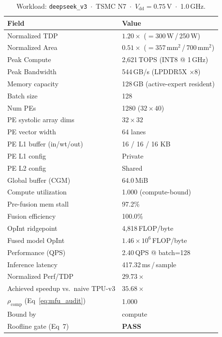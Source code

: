 \begin{table}[h]
\centering
\caption{Workload: \texttt{deepseek\_v3}~$\cdot$~TSMC N7~$\cdot$~$V_\text{dd}=0.75$\,V~$\cdot$~1.0\,GHz.}
\label{tab:cheetah_v1_deepseek_v3}
\small\setlength{\tabcolsep}{6pt}
\begin{tabular}{@{}ll@{}}
\toprule
\textbf{Field} & \textbf{Value} \\
\midrule
Normalized TDP          & $1.20\times$ ($= 300$\,W\,/\,250\,W) \\
Normalized Area         & $0.51\times$ ($= 357$\,mm$^2$\,/\,700\,mm$^2$) \\
Peak Compute            & 2{,}621\,TOPS (INT8 @ 1\,GHz) \\
Peak Bandwidth          & 544\,GB/s (LPDDR5X $\times$8) \\
Memory capacity         & 128\,GB (active-expert resident) \\
Batch size              & 128 \\
Num PEs                 & 1280 ($32 \times 40$) \\
PE systolic array dims  & $32 \times 32$ \\
PE vector width         & 64 lanes \\
PE L1 buffer (in/wt/out) & 16 / 16 / 16 KB \\
PE L1 config            & Private \\
PE L2 config            & Shared \\
Global buffer (CGM)     & 64.0\,MiB \\
\midrule
Compute utilization     & 1.000 (compute-bound) \\
Pre-fusion mem stall    & 97.2\% \\
Fusion efficiency       & 100.0\% \\
OpInt ridgepoint        & 4{,}818\,FLOP/byte \\
Fused model OpInt       & $1.46 \times 10^{6}$\,FLOP/byte \\
Performance (QPS)       & 2.40\,QPS @ batch=128 \\
Inference latency       & 417.32\,ms\,/\,sample \\
Normalized Perf/TDP     & $29.73\times$ \\
Achieved speedup vs.\ naive TPU-v3 & $35.68\times$ \\
$\rho_{\mathrm{comp}}$ (Eq~\ref{eq:mfu_audit}) & 1.000 \\
Bound by                & compute \\
Roofline gate (Eq~7)    & \textcolor{green!60!black}{\textbf{PASS}} \\

\end{tabular}
\end{table}
